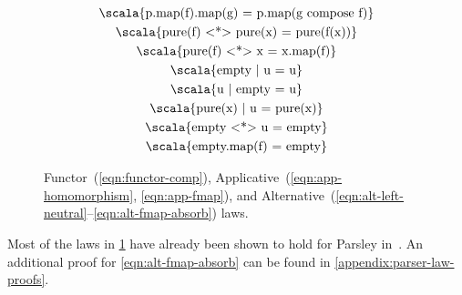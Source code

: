 \documentclass[../../main.tex]{subfiles}
\begin{document}
\begin{figure}[htbp]
\centering
\begin{gather}
  \text{\scala{p.map(f).map(g) = p.map(g compose f)}} \label{eqn:functor-comp} \\
  \text{\scala{pure(f) <*> pure(x) = pure(f(x))}} \label{eqn:app-homomorphism} \\
  \text{\scala{pure(f) <*> x = x.map(f)}} \label{eqn:app-fmap} \\
  \text{\scala{empty | u = u}} \label{eqn:alt-left-neutral} \\
  \text{\scala{u | empty = u}} \label{eqn:alt-right-neutral} \\
  \text{\scala{pure(x) | u = pure(x)}} \label{eqn:alt-left-biased-choice} \\
  \text{\scala{empty <*> u = empty}} \label{eqn:alt-empty-absorb} \\
  \text{\scala{empty.map(f) = empty}} \label{eqn:alt-fmap-absorb}
\end{gather}
\caption{Functor~(\ref{eqn:functor-comp}), Applicative~(\ref{eqn:app-homomorphism}, \ref{eqn:app-fmap}), and Alternative~(\ref{eqn:alt-left-neutral}--\ref{eqn:alt-fmap-absorb}) laws.}
\label{fig:parser-laws}
\end{figure}

Most of the laws in \cref{fig:parser-laws} have already been shown to hold for Parsley in~\cite{willis_garnishing_2018}.
An additional proof for \cref{eqn:alt-fmap-absorb} can be found in \cref{appendix:parser-law-proofs}.
\end{document}
